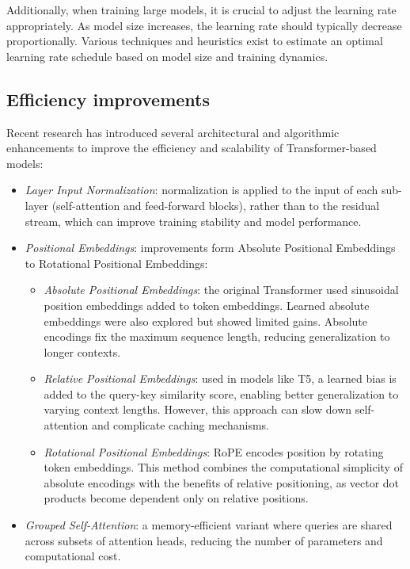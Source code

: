 Additionally, when training large models, it is crucial to adjust the learning rate appropriately. 
As model size increases, the learning rate should typically decrease proportionally. 
Various techniques and heuristics exist to estimate an optimal learning rate schedule based on model size and training dynamics.

\subsection{Efficiency improvements}
Recent research has introduced several architectural and algorithmic enhancements to improve the efficiency and scalability of Transformer-based models:
\begin{itemize}
    \item \textit{Layer Input Normalization}: normalization is applied to the input of each sub-layer (self-attention and feed-forward blocks), rather than to the residual stream, which can improve training stability and model performance.
    \item \textit{Positional Embeddings}: improvements form Absolute Positional Embeddings to Rotational Positional Embeddings:
        \begin{itemize}
            \item \textit{Absolute Positional Embeddings}: the original Transformer used sinusoidal position embeddings added to token embeddings. 
                Learned absolute embeddings were also explored but showed limited gains.
                Absolute encodings fix the maximum sequence length, reducing generalization to longer contexts.
            \item \textit{Relative Positional Embeddings}: used in models like T5, a learned bias is added to the query-key similarity score, enabling better generalization to varying context lengths.
                 However, this approach can slow down self-attention and complicate caching mechanisms.
            \item \textit{Rotational Positional Embeddings}: RoPE encodes position by rotating token embeddings. 
                This method combines the computational simplicity of absolute encodings with the benefits of relative positioning, as vector dot products become dependent only on relative positions.
        \end{itemize}
    \item \textit{Grouped Self-Attention}: a memory-efficient variant where queries are shared across subsets of attention heads, reducing the number of parameters and computational cost.

\end{itemize}
